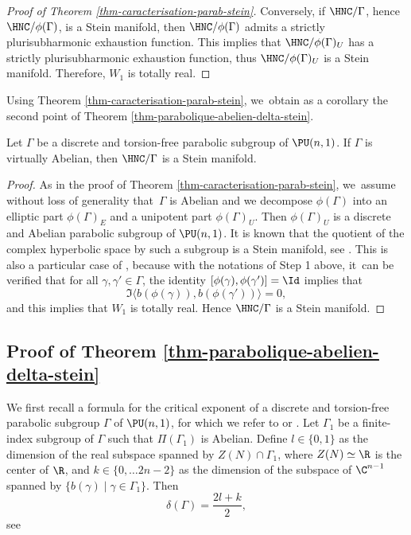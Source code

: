 \begin{proof}[Proof of Theorem \ref{thm-caracterisation-parab-stein}]
Conversely, if $\HNC/\Gamma$, hence $\HNC/\phi(\Gamma)$, is a Stein manifold, then $\HNC/\phi(\Gamma)$ admits a strictly plurisubharmonic exhaustion function. This implies that $\HNC/\phi(\Gamma)_U$ has a strictly plurisubharmonic exhaustion function, thus $\HNC/\phi(\Gamma)_U$ is a Stein manifold. Therefore, $W_1$ is totally real.
\end{proof}

Using Theorem \ref{thm-caracterisation-parab-stein}, we~obtain as a corollary the second point of Theorem \ref{thm-parabolique-abelien-delta-stein}.

\begin{corollary}\label{cor-virt-ab-stein}
Let $\Gamma$ be a discrete and torsion-free parabolic subgroup of $\PU(n,1)$. If $\Gamma$ is virtually Abelian, then $\HNC/\Gamma$ is a Stein manifold.
\end{corollary}

\begin{proof}
As in the proof of Theorem \ref{thm-caracterisation-parab-stein}, we~assume without loss of generality that~$\Gamma$ is Abelian and we decompose $\phi(\Gamma)$ into an elliptic part $\phi(\Gamma)_E$ and a unipotent part $\phi(\Gamma)_U$. Then $\phi(\Gamma)_U$ is a discrete and Abelian parabolic subgroup of $\PU(n,1)$. It is known that the quotient of the complex hyperbolic space by such a subgroup is a Stein manifold, see \cite{chenDiscreteGroupsHolomorphic2013}. This is also a particular case of \cite[Th.\,1.4]{miebachQuotientsBoundedHomogeneous2024}, because with the notations of Step 1 above, it~can be verified that for all $\gamma,\gamma'\in \Gamma$, the identity $[\phi(\gamma),\phi(\gamma')]=\Id$ implies that
\begin{equation*}
\Im\langle b(\phi(\gamma)),b(\phi(\gamma'))\rangle = 0,
\end{equation*}
and this implies that $W_1$ is totally real. Hence $\HNC/\Gamma$ is a Stein manifold.
\end{proof}
\subsection{Proof of Theorem \ref{thm-parabolique-abelien-delta-stein}}
\Changel
We first recall a formula for the critical exponent of a discrete and torsion-free parabolic subgroup $\Gamma$ of $\PU(n,1)$, for which we refer to \cite{corletteLimitSetsDiscrete1999} or \cite[\S3]{dalboSeriesPoincareGroupes2000}. Let $\Gamma_1$ be a finite-index subgroup of $\Gamma$ such that $\Pi(\Gamma_1)$ is Abelian. Define $l\in\{0,1\}$ as the dimension of the real subspace spanned by $Z(N)\cap \Gamma_1$, where $Z(N)\simeq\R$ is the center of $\R$, and $k\in\{0,\dots 2n-2\}$ as the dimension of the subspace of $\C^{n-1}$ spanned by $\{b(\gamma) \mid \gamma \in \Gamma_1\}$. Then\begin{equation}\label{eq-delta-parab}
\delta(\Gamma) = \frac{2l+k}{2},
\end{equation}
see \cite[Proof of Lem.\,3.5]{corletteLimitSetsDiscrete1999}
\Changelback

